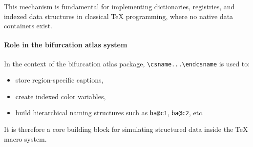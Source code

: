 This mechanism is fundamental for implementing dictionaries, registries, and indexed data structures in classical \TeX{} programming, where no native data containers exist.



\paragraph{Role in the bifurcation atlas system}

In the context of the bifurcation atlas package, \verb|\csname...\endcsname| is used to:

\begin{itemize}
\item store region-specific captions,
\item create indexed color variables,
\item build hierarchical naming structures such as \texttt{ba@c1}, \texttt{ba@c2}, etc.
\end{itemize}

It is therefore a core building block for simulating structured data inside the TeX macro system.